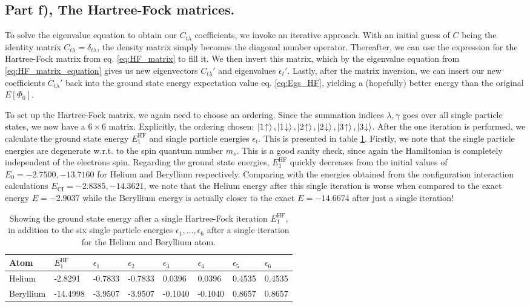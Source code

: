\documentclass{article}
\newcommand{\upst}[1]{#1\hspace{-2px}\uparrow}
\newcommand{\downst}[1]{#1\hspace{-2px}\downarrow}
\newcommand{\hafo}[1]{#1^{\text{HF}}}
\begin{document}
\subsection*{Part f), The Hartree-Fock matrices.}
    To solve the eigenvalue equation to obtain our $C_{t\lambda}$ coefficients, we invoke an iterative approach. With an initial guess of $C$ being the identity matrix $C_{t\lambda} = \delta_{t\lambda}$, the density matrix simply becomes the diagonal number operator. Thereafter, we can use the expression for the Hartree-Fock matrix from eq. \eqref{eq:HF_matrix} to fill it. We then invert this matrix, which by the eigenvalue equation from \eqref{eq:HF_matrix_equation} gives us new eigenvectors $C_{t\lambda}'$ and eigenvalues $\epsilon_t'$. Lastly, after the matrix inversion, we can insert our new coefficients $C_{t\lambda}'$ back into the ground state energy expectation value eq. \eqref{eq:Egs_HF}, yielding a (hopefully) better energy than the original $E[\Phi_0]$. 
    
    To set up the Hartree-Fock matrix, we again need to choose an ordering. Since the summation indices $\lambda,\gamma$ goes over all single particle states, we now have a $6 \times 6$ matrix. Explicitly, the ordering chosen: $\ket{\upst{1}}, \ket{\downst{1}}, \ket{\upst{2}}, \ket{\downst{2}}, \ket{\upst{3}}, \ket{\downst{3}}$. After the one iteration is performed, we calculate the ground state energy $\hafo{E_1}$ and single particle energies $\epsilon_t$. This is presented in table \ref{tab:HF_E}. Firstly, we note that the single particle energies are degenerate w.r.t. to the spin quantum number $m_s$. This is a good sanity check, since again the Hamiltonian is completely independent of the electrons spin. Regarding the ground state energies, $\hafo{E_1}$ quickly decreases from the initial values of $E_0 = -2.7500, -13.7160$ for Helium and Beryllium respectively. Comparing with the energies obtained from the configuration interaction calculations $E_{\text{CI}} = -2.8385, -14.3621$, we note that the Helium energy after this single iteration is worse when compared to the exact energy $E = -2.9037$ while the Beryllium energy is actually closer to the exact $E = -14.6674$ after just a single iteration!
    
    \begin{table}[H]
        \centering
        \begin{tabular}{l|l|l|l|l|l|l|l}
        Atom      &  $\hafo{E_1}$ & $\epsilon_1$ & $\epsilon_2$ & $\epsilon_3$ & $\epsilon_4$ & $\epsilon_5$ & $\epsilon_6$ \\
        \hline
        Helium    & -2.8291     & -0.7833    & -0.7833  & 0.0396  & 0.0396 & 0.4535 & 0.4535   \\
        Beryllium & -14.4998     & -3.9507    &  -3.9507 & -0.1040  &  -0.1040 & 0.8657 & 0.8657 
        \end{tabular}
        \caption{Showing the ground state energy after a single Hartree-Fock iteration $\hafo{E_1}$, in addition to the six single particle energies $\epsilon_1, ... , \epsilon_6$ after a single iteration for the Helium and Beryllium atom. }\label{tab:HF_E}
    \end{table}
\end{document}

